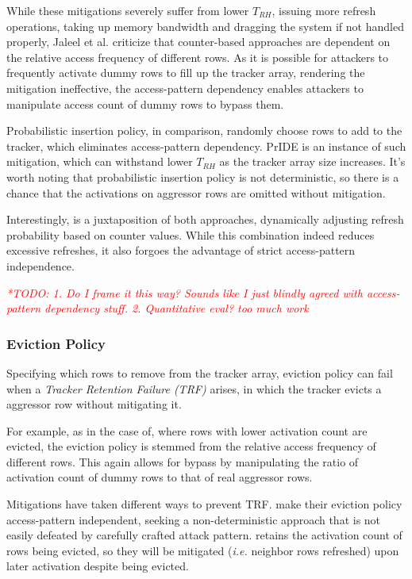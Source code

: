\documentclass[journal,twocolumn]{IEEEtran}
\newcommand\todo[1]{\textit{\textcolor{red}{*TODO: #1}}}
\begin{document}
	While these mitigations severely suffer from lower $T_{RH}$, issuing more refresh operations, taking up memory bandwidth and dragging the system if not handled properly, Jaleel et al.\cite{Jaleel24} criticize that counter-based approaches are dependent on the relative access frequency of different rows. As it is  possible for attackers to frequently activate dummy rows to fill up the tracker array\cite{Frigo20}, rendering the mitigation ineffective, the access-pattern dependency enables attackers to manipulate access count of dummy rows to bypass them.
	
	Probabilistic insertion policy, in comparison, randomly choose rows to add to the tracker, which eliminates access-pattern dependency. PrIDE\cite{Jaleel24} is an instance of such mitigation, which can withstand lower $T_{RH}$ as the tracker array size increases. It's worth noting that probabilistic insertion policy is not deterministic, so there is a chance that the activations on aggressor rows are omitted without mitigation.
	
	Interestingly, \cite{Demirseren24} is a juxtaposition of both approaches, dynamically adjusting refresh probability based on counter values. While this combination indeed reduces excessive refreshes, it also forgoes the advantage of strict access-pattern independence.
	
	\todo{1. Do I frame it this way? Sounds like I just blindly agreed with access-pattern dependency stuff. 2. Quantitative eval? too much work}
	
	\subsubsection{Eviction Policy}
	
	Specifying which rows to remove from the tracker array, eviction policy can fail when a \textit{Tracker Retention Failure (TRF)} arises, in which the tracker evicts a aggressor row without mitigating it.
	
	For example, as in the case of\cite{Kim23}, where rows with lower activation count are evicted, the eviction policy is stemmed from the relative access frequency of different rows. This again allows for bypass by manipulating the ratio of activation count of dummy rows to that of real aggressor rows.
	
	Mitigations have taken different ways to prevent TRF. \cite{Bostanci24, Jaleel24} make their eviction policy access-pattern independent, seeking a non-deterministic approach that is not easily defeated by carefully crafted attack pattern. \cite{Nazaraliyev25} retains the activation count of rows being evicted, so they will be mitigated (\textit{i.e.} neighbor rows refreshed) upon later activation despite being evicted.
	
\end{document}
